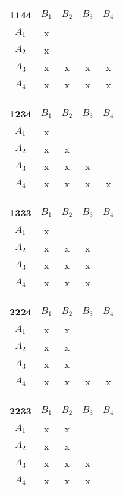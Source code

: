 \begin{tabular}{c||c|c|c|c}
1144 & $B_1$ & $B_2$ & $B_3$ & $B_4$ \\\hline\hline
 $A_1$ & x & ~ & ~ & ~ \\
 $A_2$ & x & ~ & ~ & ~ \\
 $A_3$ & x & x & x & x \\
 $A_4$ & x & x & x & x \\
\end{tabular}
\hfill
\begin{tabular}{c||c|c|c|c}
1234 & $B_1$ & $B_2$ & $B_3$ & $B_4$ \\\hline\hline
 $A_1$ & x & ~ & ~ & ~ \\
 $A_2$ & x & x & ~ & ~ \\
 $A_3$ & x & x & x & ~ \\
 $A_4$ & x & x & x & x \\
\end{tabular}
\hfill
\begin{tabular}{c||c|c|c|c}
1333 & $B_1$ & $B_2$ & $B_3$ & $B_4$ \\\hline\hline
 $A_1$ & x & ~ & ~ & ~ \\
 $A_2$ & x & x & x & ~ \\
 $A_3$ & x & x & x & ~ \\
 $A_4$ & x & x & x & ~ \\
\end{tabular}

\begin{tabular}{c||c|c|c|c}
2224 & $B_1$ & $B_2$ & $B_3$ & $B_4$ \\\hline\hline
 $A_1$ & x & x & ~ & ~ \\
 $A_2$ & x & x & ~ & ~ \\
 $A_3$ & x & x & ~ & ~ \\
 $A_4$ & x & x & x & x \\
\end{tabular}
\hfill
\begin{tabular}{c||c|c|c|c}
2233 & $B_1$ & $B_2$ & $B_3$ & $B_4$ \\\hline\hline
 $A_1$ & x & x & ~ & ~ \\
 $A_2$ & x & x & ~ & ~ \\
 $A_3$ & x & x & x & ~ \\
 $A_4$ & x & x & x & ~ \\
\end{tabular}


~


